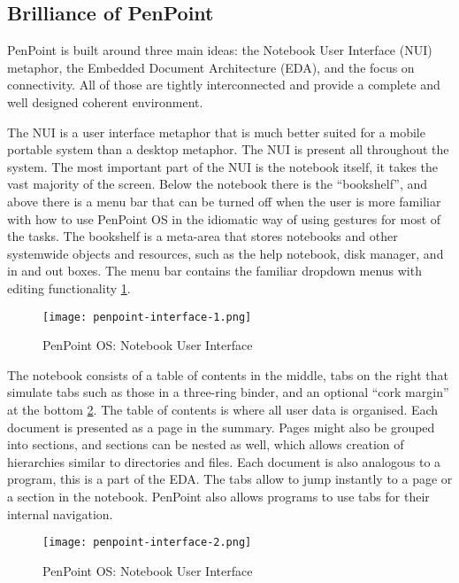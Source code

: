 \subsection{Brilliance of PenPoint}
PenPoint is built around three main ideas: the Notebook User Interface (NUI)
metaphor, the Embedded Document Architecture (EDA), and the focus on
connectivity. All of those are tightly interconnected and provide a complete
and well designed coherent environment.

The NUI is a user interface metaphor that is much better suited for a mobile
portable system than a desktop metaphor. The NUI is present all throughout the
system. The most important part of the NUI is the notebook itself, it takes the
vast majority of the screen. Below the notebook there is the ``bookshelf'', and
above there is a menu bar that can be turned off when the user is more familiar
with how to use PenPoint OS in the idiomatic way of using gestures for most of
the tasks. The bookshelf is a meta-area that stores notebooks and other
systemwide objects and resources, such as the help notebook, disk manager, and
in and out boxes. The menu bar contains the familiar dropdown menus with
editing functionality \ref{fig:notebook-user-interface1}.

\begin{figure}[!h]
    \centering \texttt{[image: penpoint-interface-1.png]}
    \caption{PenPoint OS: Notebook User Interface}
    \label{fig:notebook-user-interface1}
\end{figure}

The notebook consists of a table of contents in the middle, tabs on the right
that simulate tabs such as those in a three-ring binder, and an optional ``cork
margin'' at the bottom \ref{fig:notebook-user-interface2}. The table of contents
is where all user data is organised. Each document is presented as a page in
the summary. Pages might also be grouped into sections, and sections can be
nested as well, which allows creation of hierarchies similar to directories and
files. Each document is also analogous to a program, this is a part of the EDA.
The tabs allow to jump instantly to a page or a section in the notebook.
PenPoint also allows programs to use tabs for their internal navigation.

\begin{figure}[!h]
    \centering \texttt{[image: penpoint-interface-2.png]}
    \caption{PenPoint OS: Notebook User Interface}
    \label{fig:notebook-user-interface2}
\end{figure}

